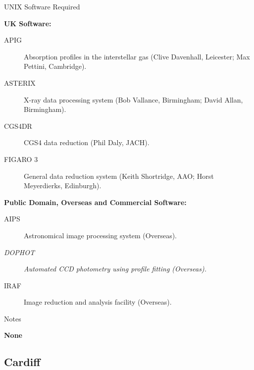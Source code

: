 \vspace{5mm}
\begin{center}
{\large\sc UNIX Software Required}
\end{center}

\begin{center}
{\bf UK Software:}
\end{center}

\begin{description}
\item[APIG] Absorption profiles in the interstellar gas (Clive Davenhall,
Leicester; Max Pettini, Cambridge).
\item[ASTERIX] X-ray data processing system (Bob Vallance, Birmingham;
David Allan, Birmingham).
\item[CGS4DR] CGS4 data reduction (Phil Daly, JACH).
\item[FIGARO 3] General data reduction system (Keith Shortridge, AAO; Horst
Meyerdierks, Edinburgh).
\end{description}


\newpage
\vspace{5mm}
\begin{center}
{\bf Public Domain, Overseas and Commercial Software:}
\end{center}

\begin{description}
\item[AIPS] Astronomical image processing system (Overseas).
\item[{\em DOPHOT}] {\em Automated CCD photometry using profile fitting
(Overseas).}
\item[IRAF] Image reduction and analysis facility (Overseas).
\end{description}


\vspace{5mm}
\begin{center}
{\large\sc Notes}
\end{center}

{\bf None}


\newpage
\subsection{Cardiff}

\renewcommand{\starsitename}{Cardiff}
\renewcommand{\starnodename}{CARDIF}

\renewcommand{\starunixdate}{1993 October 1}
\renewcommand{\starupdate}{1993 October 26}

\renewcommand{\starsitetelephone}{0222 874000 Ext. 5282}
\renewcommand{\starsitefax}{0222 874056}


